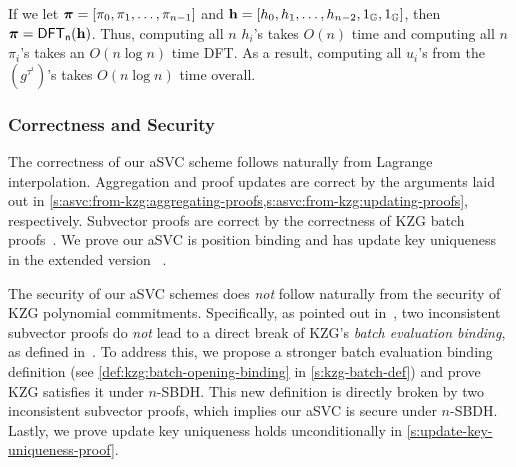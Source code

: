 If we let $\bm{\mathrm{\pi}}=[\pi_0, \pi_1, \dots, \pi_{n-1}]$ and $\bm{\mathrm{h}} = [h_0, h_1, \dots, h_{n-2}, 1_{\mathbb{G}}, 1_{\mathbb{G}}]$, then $\bm{\mathrm{\pi}} = \mathsf{DFT_n}(\bm{\mathrm{h}})$.
Thus, computing all $n$ $h_i$'s takes $O(n)$ time and computing all $n$ $\pi_i$'s takes an $O(n\log{n})$ time DFT.
As a result, computing all $u_i$'s from the $(g^{\tau^i})$'s takes $O(n\log{n})$ time overall.

\subsubsection{Correctness and Security}
\label{s:svc:correctness-and-security}
The correctness of our aSVC scheme follows naturally from Lagrange interpolation.
Aggregation and proof updates are correct by the arguments laid out in \cref{s:asvc:from-kzg:aggregating-proofs,s:asvc:from-kzg:updating-proofs}, respectively.
Subvector proofs are correct by the correctness of KZG batch proofs~\cite{KZG10a}.
\ifCameraReady
We prove our aSVC is position binding and has update key uniqueness in the extended version ~\cite[Appendix C]{TAB+20e}.
\else

The security of our aSVC schemes does \textit{not} follow naturally from the security of KZG polynomial commitments.
Specifically, as pointed out in~\cite{GRWZ20}, two inconsistent subvector proofs do \textit{not} lead to a direct break of KZG's \textit{batch evaluation binding}, as defined in~\cite[Sec. 3.4]{KZG10a}.
To address this, we propose a stronger batch evaluation binding definition (see \cref{def:kzg:batch-opening-binding} in \cref{s:kzg-batch-def}) and prove KZG satisfies it under $n$-SBDH.
This new definition is directly broken by two inconsistent subvector proofs, which implies our aSVC is secure under $n$-SBDH.
Lastly, we prove update key uniqueness holds unconditionally in \cref{s:update-key-uniqueness-proof}.
\fi
